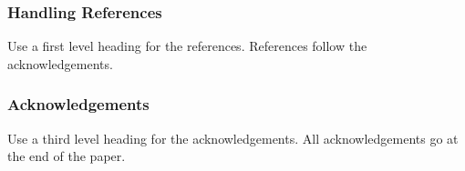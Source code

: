 \documentclass[a4paper]{article}
\begin{document}
\subsubsection{Handling References}

Use a first level heading for the references. References follow the
acknowledgements.


\subsubsection{Acknowledgements}

Use a third level heading for the acknowledgements. All acknowledgements
go at the end of the paper.


 


%
%
%
\end{document}
